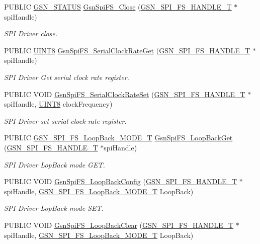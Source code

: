 \begin{DoxyCompactItemize}
PUBLIC \hyperlink{a00660_gada5951904ac6110b1fa95e51a9ddc217}{GSN\_\-STATUS} \hyperlink{a00655_ga9e8a0b280a3bfe80b6c8a2e849632fc6}{GsnSpiFS\_\-Close} (\hyperlink{a00234}{GSN\_\-SPI\_\-FS\_\-HANDLE\_\-T} $\ast$spiHandle)
\begin{DoxyCompactList}\small\item\em SPI Driver close. \end{DoxyCompactList}\item 
PUBLIC \hyperlink{a00660_gab27e9918b538ce9d8ca692479b375b6a}{UINT8} \hyperlink{a00655_ga5bf389dcdb9cb21c451ae9816c6a1aae}{GsnSpiFS\_\-SerialClockRateGet} (\hyperlink{a00234}{GSN\_\-SPI\_\-FS\_\-HANDLE\_\-T} $\ast$spiHandle)
\begin{DoxyCompactList}\small\item\em SPI Driver Get serial clock rate register. \end{DoxyCompactList}\item 
PUBLIC VOID \hyperlink{a00655_ga82e98d4047f21914ae66c23723e5dbdc}{GsnSpiFS\_\-SerialClockRateSet} (\hyperlink{a00234}{GSN\_\-SPI\_\-FS\_\-HANDLE\_\-T} $\ast$spiHandle, \hyperlink{a00660_gab27e9918b538ce9d8ca692479b375b6a}{UINT8} clockFrequency)
\begin{DoxyCompactList}\small\item\em SPI Driver set serial clock rate register. \end{DoxyCompactList}\item 
PUBLIC \hyperlink{a00655_ga721139ec14f269f577231293b4b96dad}{GSN\_\-SPI\_\-FS\_\-LoopBack\_\-MODE\_\-T} \hyperlink{a00655_ga915a936f8beaaa2d94e6e4b560ae9f5f}{GsnSpiFS\_\-LoopBackGet} (\hyperlink{a00234}{GSN\_\-SPI\_\-FS\_\-HANDLE\_\-T} $\ast$spiHandle)
\begin{DoxyCompactList}\small\item\em SPI Driver LopBack mode GET. \end{DoxyCompactList}\item 
PUBLIC VOID \hyperlink{a00655_gac394b037df150de051a331bc21a45d66}{GsnSpiFS\_\-LoopBackConfig} (\hyperlink{a00234}{GSN\_\-SPI\_\-FS\_\-HANDLE\_\-T} $\ast$spiHandle, \hyperlink{a00655_ga721139ec14f269f577231293b4b96dad}{GSN\_\-SPI\_\-FS\_\-LoopBack\_\-MODE\_\-T} LoopBack)
\begin{DoxyCompactList}\small\item\em SPI Driver LopBack mode SET. \end{DoxyCompactList}\item 
PUBLIC VOID \hyperlink{a00655_ga29dd85f19e47a96f7cf9afa087e6226a}{GsnSpiFS\_\-LoopBackClear} (\hyperlink{a00234}{GSN\_\-SPI\_\-FS\_\-HANDLE\_\-T} $\ast$spiHandle, \hyperlink{a00655_ga721139ec14f269f577231293b4b96dad}{GSN\_\-SPI\_\-FS\_\-LoopBack\_\-MODE\_\-T} LoopBack)

\end{DoxyCompactItemize}
